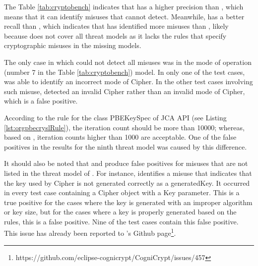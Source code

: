 The Table \ref{tab:cryptobench} indicates that \codyze{} has a higher precision than \cognicryptsast{}, which means that it can identify misuses that \cognicryptsast{} cannot detect. Meanwhile, \cognicryptsast{} has a better recall than \codyze, which indicates that \cognicryptsast{} has identified more misuses than \codyze, likely because \codyze{} does not cover all threat models as it lacks the \MARK{} rules that specify cryptographic misuses in the missing models. 

The only case in which \codyze{} could not detect all misuses was in the mode of operation (number 7 in the Table \ref{tab:cryptobench}) model. In only one of the test cases, \codyze{} was able to identify an incorrect mode of Cipher. In the other test cases involving such misuse, \codyze{} detected an invalid Cipher rather than an invalid mode of Cipher, which is a false positive.

According to the \crysl{} rule for the class PBEKeySpec of JCA API (see Listing \ref{lst:orgpbecryslRule}), the iteration count should be more than 10000; whereas, based on \cryptoapibench, iteration counts higher than 1000 are acceptable. One of the false positives in the \cognicryptsast{} results for the ninth threat model was caused by this difference.

It should also be noted that \codyze{} and \cognicryptsast{} produce false positives for misuses that are not listed in the threat model of \cryptoapibench. For instance, \cognicryptsast{} identifies a misuse that indicates that the key used by Cipher is not generated correctly as a generatedKey. It occurred in every test case containing a Cipher object with a Key parameter. This is a true positive for the cases where the key is generated with an improper algorithm or key size, but for the cases where a key is properly generated based on the \crysl{} rules, this is a false positive. Nine of the test cases contain this false positive. This issue has already been reported to \cognicryptsast's Github page\footnote{https://github.com/eclipse-cognicrypt/CogniCrypt/issues/457}. 

